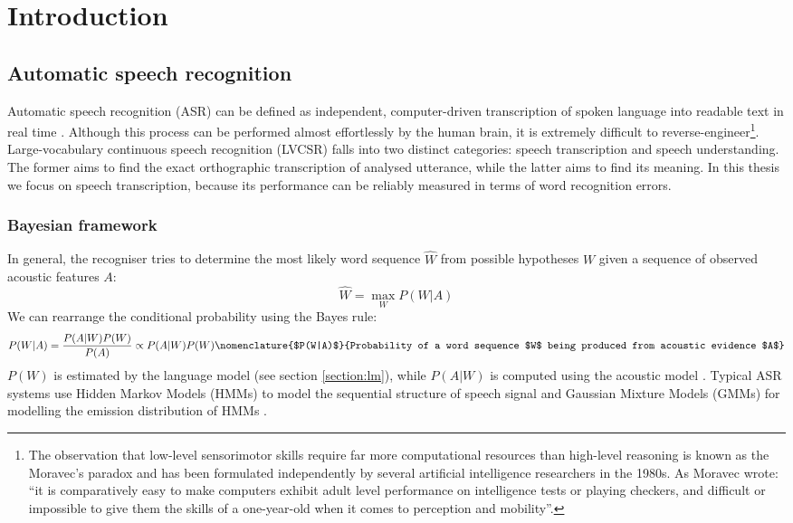 \chapter{Introduction}
\label{chapter:intro}

\section{Automatic speech recognition}
\label{section:asr}
Automatic speech recognition (ASR)  can be defined as independent, computer-driven transcription of spoken language into readable text in real time \cite{stuckless1994developments, jelinek1997statistical}. Although this process can be performed almost effortlessly by the human brain, it is extremely difficult to reverse-engineer\footnote{The observation that low-level sensorimotor skills require far more computational resources than high-level reasoning is known as the Moravec's paradox and has been formulated independently by several artificial intelligence researchers in the 1980s. As Moravec wrote: ``it is comparatively easy to make computers exhibit adult level performance on intelligence tests or playing checkers, and difficult or impossible to give them the skills of a one-year-old when it comes to perception and mobility''\cite{moravec1988mind}.}. Large-vocabulary continuous speech recognition (LVCSR) falls into two distinct categories: speech transcription and speech understanding. The former aims to find the exact orthographic transcription of analysed utterance, while the latter aims to find its meaning. In this thesis we focus on speech transcription, because its performance can be reliably measured in terms of word recognition errors.

\subsection{Bayesian framework}
In general, the recogniser tries to determine the most likely word sequence $\hat{W}$ from possible hypotheses $W$ given a sequence of observed acoustic features $A$:
\begin{equation}
\label{equation:recogniser}
  \hat{W}=\max_{W}P(W|A)
\end{equation}
We can rearrange the conditional probability using the Bayes rule:
\begin{equation}
  \label{equation:bayesian}
  P(W|A)=\frac{P(A|W)P(W)}{P(A)}\propto{P(A|W)P(W)}
  \nomenclature{$P(W|A)$}{Probability of a word sequence $W$ being produced from acoustic evidence $A$}
\end{equation}
$P(W)$ is estimated by the language model (see section \ref{section:lm}), while $P(A|W)$ is computed using the acoustic model \cite{whittaker2000statistical}. Typical ASR systems use Hidden Markov Models (HMMs)  to model the sequential structure of speech signal \cite{juang1985mixture, baker1975dragon} and Gaussian Mixture Models (GMMs)  for modelling the emission distribution of HMMs \cite{mohamed2012acoustic, bourlard1994connectionist}.

